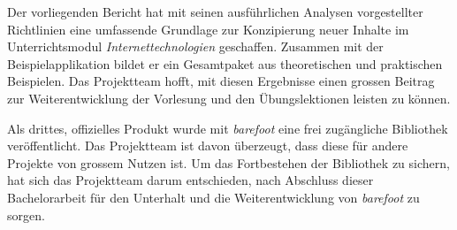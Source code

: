 Der vorliegenden Bericht hat mit seinen ausführlichen Analysen vorgestellter Richtlinien eine umfassende Grundlage zur Konzipierung neuer Inhalte im Unterrichtsmodul \emph{Internettechnologien} geschaffen. Zusammen mit der Beispielapplikation bildet er ein Gesamtpaket aus theoretischen und praktischen Beispielen. Das Projektteam hofft, mit diesen Ergebnisse einen grossen Beitrag zur Weiterentwicklung der Vorlesung und den Übungslektionen leisten zu können.

Als drittes, offizielles Produkt wurde mit \emph{barefoot} eine frei zugängliche Bibliothek veröffentlicht. Das Projektteam ist davon überzeugt, dass diese für andere Projekte von grossem Nutzen ist. Um das Fortbestehen der Bibliothek zu sichern, hat sich das Projektteam darum entschieden, nach Abschluss dieser Bachelorarbeit für den Unterhalt und die Weiterentwicklung von \emph{barefoot} zu sorgen.

